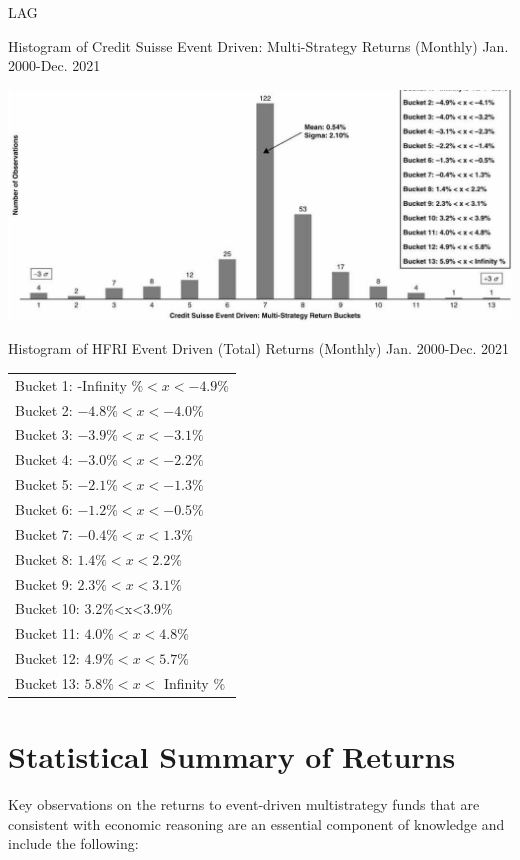 \documentclass[11pt]{article}
\begin{document}
LAG

Histogram of Credit Suisse Event Driven: Multi-Strategy Returns (Monthly) Jan. 2000-Dec. 2021

\begin{center}
\includegraphics[max width=\textwidth]{2024_04_09_3a5f3656dbadc6becccfg-3(2)}
\end{center}

Histogram of HFRI Event Driven (Total) Returns (Monthly) Jan. 2000-Dec. 2021

\begin{center}
\begin{tabular}{l}
Bucket 1: -Infinity $\%<x<-4.9 \%$ \\
Bucket 2: $-4.8 \%<x<-4.0 \%$ \\
Bucket 3: $-3.9 \%<x<-3.1 \%$ \\
Bucket 4: $-3.0 \%<x<-2.2 \%$ \\
Bucket 5: $-2.1 \%<x<-1.3 \%$ \\
Bucket 6: $-1.2 \%<x<-0.5 \%$ \\
Bucket 7: $-0.4 \%<x<1.3 \%$ \\
Bucket 8: $1.4 \%<x<2.2 \%$ \\
Bucket 9: $2.3 \%<x<3.1 \%$ \\
Bucket 10: 3.2\%<x<3.9\% \\
Bucket 11: $4.0 \%<x<4.8 \%$ \\
Bucket 12: $4.9 \%<x<5.7 \%$ \\
Bucket 13: $5.8 \%<x<$ Infinity $\%$ \\
\hline
\end{tabular}
\end{center}

\section*{Statistical Summary of Returns}
Key observations on the returns to event-driven multistrategy funds that are consistent with economic reasoning are an essential component of knowledge and include the following:
\end{document}
